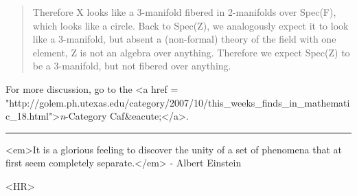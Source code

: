 \begin{quote}
   Therefore X looks like a 3-manifold fibered in 2-manifolds over
   Spec(F), which looks like a circle.  Back to Spec(Z), we 
   analogously expect it to look like a 3-manifold, but absent a
   (non-formal) theory of the field with one element, Z is not
   an algebra over anything.  Therefore we expect Spec(Z) to
   be a 3-manifold, but not fibered over anything.
\end{quote}
    

For more discussion, go to the
<a href = "http://golem.ph.utexas.edu/category/2007/10/this_weeks_finds_in_mathematic_18.html">\emph{n}-Category Caf&eacute;</a>.







\par\noindent\rule{\textwidth}{0.4pt}
<em>It is a glorious feeling to discover the unity of a set of phenomena
that at first seem completely separate.</em> - Albert Einstein

<HR>



